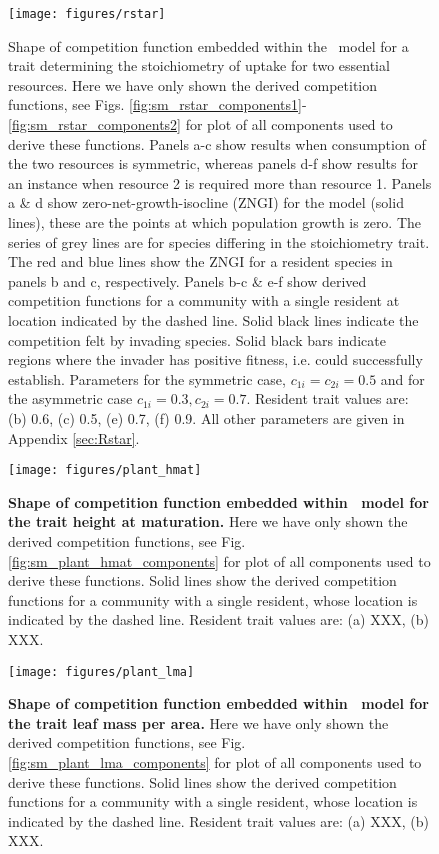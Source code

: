 \documentclass[a4paper,11pt]{article}
\begin{document}
\begin{figure}[h]
  \centering
  \texttt{[image: figures/rstar]}
  \caption{Shape of competition function embedded within the \Rstar\ model
  for a trait determining the stoichiometry of uptake for two essential resources.
  Here we have only shown the derived  competition functions, see Figs.
  \ref{fig:sm_rstar_components1}-\ref{fig:sm_rstar_components2} for plot of all
  components used to derive these functions.
  Panels a-c show results when consumption of the two resources is symmetric, whereas
  panels d-f show results for an instance when resource 2 is required more than
  resource 1. Panels a \& d show zero-net-growth-isocline (ZNGI) for
  the  model  (solid lines), these are the points at which population growth is zero.
  The series of grey lines are for species differing in the stoichiometry trait.
  The red and blue lines show the ZNGI for a resident species in panels b and
  c, respectively. Panels b-c \& e-f show derived competition functions for a
  community with a single resident at location indicated by the dashed line.
  Solid black lines indicate the competition felt by invading species. Solid
  black bars indicate regions where the invader has positive fitness, i.e.
  could successfully establish. Parameters for the symmetric case, $c_{1i} =
  c_ {2i}=0.5$ and for the asymmetric case $c_{1i} = 0.3, c_ {2i}=0.7$. Resident
  trait values are: (b) 0.6, (c) 0.5, (e) 0.7, (f) 0.9. All other parameters
  are given in Appendix \ref{sec:Rstar}.
  \label{fig:Rstar}}
\end{figure}

\begin{figure}[h]
  \centering
  \texttt{[image: figures/plant\_hmat]}
  \caption{\textbf{Shape of competition function embedded within \plant\ model for
  the trait height at maturation.}
  Here we have only shown the derived  competition functions, see Fig.
  \ref{fig:sm_plant_hmat_components} for plot of all components used to derive these functions.
  Solid lines show the derived competition functions for a community with a
  single resident, whose location is indicated by the dashed line.
  Resident trait values are: (a) XXX, (b) XXX.
  \label{fig:plant_hmat}}
\end{figure}

\begin{figure}[h]
  \centering
  \texttt{[image: figures/plant\_lma]}
  \caption{\textbf{Shape of competition function embedded within \plant\ model for
  the trait leaf mass per area.}
  Here we have only shown the derived  competition functions, see Fig.
  \ref{fig:sm_plant_lma_components} for plot of all components used to derive these functions.
  Solid lines show the derived competition functions for a community with a
  single resident, whose location is indicated by the dashed line.
  Resident trait values are: (a) XXX, (b) XXX.
  \label{fig:plant_lma}}
\end{figure}
\end{document}
